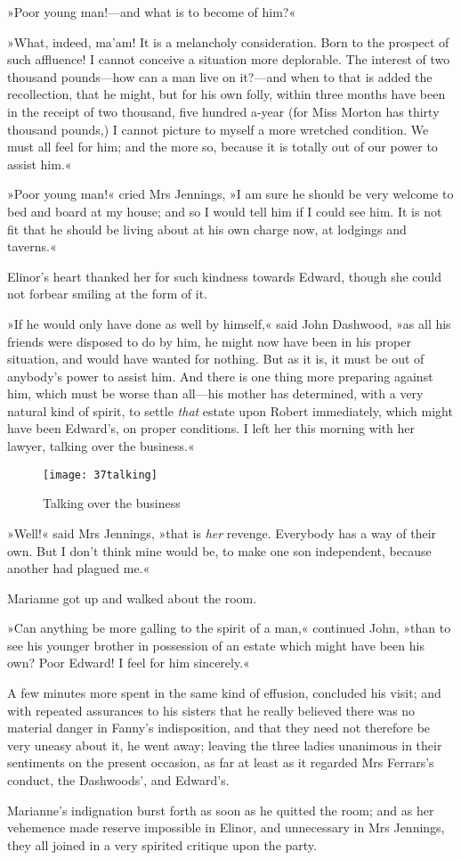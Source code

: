 »Poor young man!—and what is to become of him?«

»What, indeed, ma’am! It is a melancholy consideration. Born to the prospect of such affluence! I cannot conceive a situation more deplorable. The interest of two thousand pounds—how can a man live on it?—and when to that is added the recollection, that he might, but for his own folly, within three months have been in the receipt of two thousand, five hundred a-year (for Miss Morton has thirty thousand pounds,) I cannot picture to myself a more wretched condition. We must all feel for him; and the more so, because it is totally out of our power to assist him.«

»Poor young man!« cried Mrs Jennings, »I am sure he should be very welcome to bed and board at my house; and so I would tell him if I could see him. It is not fit that he should be living about at his own charge now, at lodgings and taverns.«

Elinor’s heart thanked her for such kindness towards Edward, though she could not forbear smiling at the form of it.

»If he would only have done as well by himself,« said John Dashwood, »as all his friends were disposed to do by him, he might now have been in his proper situation, and would have wanted for nothing. But as it is, it must be out of anybody’s power to assist him. And there is one thing more preparing against him, which must be worse than all—his mother has determined, with a very natural kind of spirit, to settle \textit{that} estate upon Robert immediately, which might have been Edward’s, on proper conditions. I left her this morning with her lawyer, talking over the business.«

\begin{figure}[tbph]
\centering
\texttt{[image: 37talking]}
\caption{Talking over the business}
\end{figure}

»Well!« said Mrs Jennings, »that is \textit{her} revenge. Everybody has a way of their own. But I don’t think mine would be, to make one son independent, because another had plagued me.«

Marianne got up and walked about the room.

»Can anything be more galling to the spirit of a man,« continued John, »than to see his younger brother in possession of an estate which might have been his own? Poor Edward! I feel for him sincerely.«

A few minutes more spent in the same kind of effusion, concluded his visit; and with repeated assurances to his sisters that he really believed there was no material danger in Fanny’s indisposition, and that they need not therefore be very uneasy about it, he went away; leaving the three ladies unanimous in their sentiments on the present occasion, as far at least as it regarded Mrs Ferrars’s conduct, the Dashwoods’, and Edward’s.

Marianne’s indignation burst forth as soon as he quitted the room; and as her vehemence made reserve impossible in Elinor, and unnecessary in Mrs Jennings, they all joined in a very spirited critique upon the party.